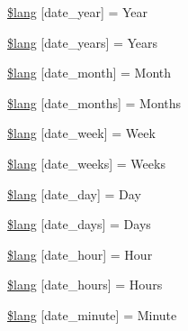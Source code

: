\begin{DoxyCompactItemize}
\item 
\mbox{\hyperlink{date__lang_8php_a0e08dd6cd5135d97d48d1e6c543622aa}{\$lang}} \mbox{[}\textquotesingle{}date\+\_\+year\textquotesingle{}\mbox{]} = \textquotesingle{}Year\textquotesingle{}
\item 
\mbox{\hyperlink{date__lang_8php_abcf9f3f2b8ac9be4ea1ad49210b1e677}{\$lang}} \mbox{[}\textquotesingle{}date\+\_\+years\textquotesingle{}\mbox{]} = \textquotesingle{}Years\textquotesingle{}
\item 
\mbox{\hyperlink{date__lang_8php_a585754183b0d89cc0184f7a1ba8e4557}{\$lang}} \mbox{[}\textquotesingle{}date\+\_\+month\textquotesingle{}\mbox{]} = \textquotesingle{}Month\textquotesingle{}
\item 
\mbox{\hyperlink{date__lang_8php_a25da59a54a07cc2cbe01227a80d05b9f}{\$lang}} \mbox{[}\textquotesingle{}date\+\_\+months\textquotesingle{}\mbox{]} = \textquotesingle{}Months\textquotesingle{}
\item 
\mbox{\hyperlink{date__lang_8php_ae8b3e7ba598202350cba45a12c7f1f3e}{\$lang}} \mbox{[}\textquotesingle{}date\+\_\+week\textquotesingle{}\mbox{]} = \textquotesingle{}Week\textquotesingle{}
\item 
\mbox{\hyperlink{date__lang_8php_a828ef4bc38886194cf3c21daf3a9497b}{\$lang}} \mbox{[}\textquotesingle{}date\+\_\+weeks\textquotesingle{}\mbox{]} = \textquotesingle{}Weeks\textquotesingle{}
\item 
\mbox{\hyperlink{date__lang_8php_a6e0d9671ff00251068a461bf3ac2ecc4}{\$lang}} \mbox{[}\textquotesingle{}date\+\_\+day\textquotesingle{}\mbox{]} = \textquotesingle{}Day\textquotesingle{}
\item 
\mbox{\hyperlink{date__lang_8php_a9f64bb4ba6d656ce3e7bc863179d3851}{\$lang}} \mbox{[}\textquotesingle{}date\+\_\+days\textquotesingle{}\mbox{]} = \textquotesingle{}Days\textquotesingle{}
\item 
\mbox{\hyperlink{date__lang_8php_aa828796965e9d1d80e021a3dc7b112e7}{\$lang}} \mbox{[}\textquotesingle{}date\+\_\+hour\textquotesingle{}\mbox{]} = \textquotesingle{}Hour\textquotesingle{}
\item 
\mbox{\hyperlink{date__lang_8php_a5cc3bf273df08ef5ee41a226542644de}{\$lang}} \mbox{[}\textquotesingle{}date\+\_\+hours\textquotesingle{}\mbox{]} = \textquotesingle{}Hours\textquotesingle{}
\item 
\mbox{\hyperlink{date__lang_8php_a53da1296d1dbbb36f19d526a4068097b}{\$lang}} \mbox{[}\textquotesingle{}date\+\_\+minute\textquotesingle{}\mbox{]} = \textquotesingle{}Minute\textquotesingle{}

\end{DoxyCompactItemize}
